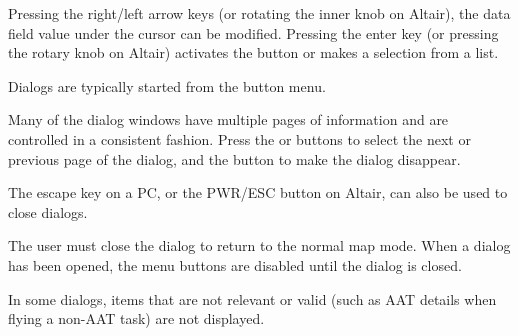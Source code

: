 \documentclass[a4paper,12pt]{refrep}
\begin{document}
Pressing the right/left arrow keys (or rotating the inner knob
on Altair), the data field value under the cursor can be modified.
Pressing the enter key (or pressing the rotary knob on Altair)
activates the button or makes a selection from a list.

Dialogs are typically started from the button menu.  

Many of the dialog windows have multiple pages of information and are
controlled in a consistent fashion.  Press the \button{$>$} or
\button{$<$} buttons to select the next or previous page of the
dialog, and the  button to make the dialog disappear.

The escape key on a PC, or the PWR/ESC button on Altair, can
also be used to close dialogs.

The user must close the dialog to return to the normal map mode.  When
a dialog has been opened, the menu buttons are disabled until the
dialog is closed.

In some dialogs, items that are not relevant or valid (such as AAT
details when flying a non-AAT task) are not displayed.

\end{document}
